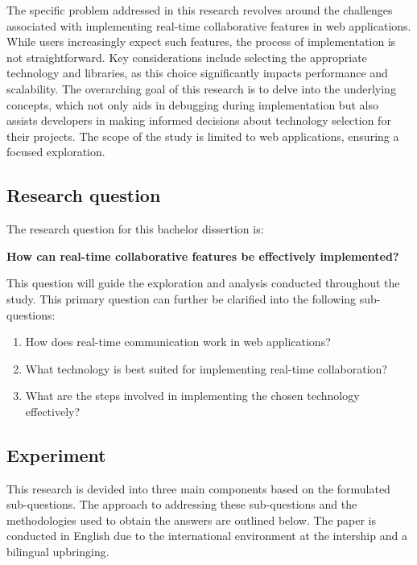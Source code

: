 The specific problem addressed in this research revolves around the challenges associated with implementing real-time collaborative features in web applications. While users increasingly expect such features, the process of implementation is not straightforward. Key considerations include selecting the appropriate technology and libraries, as this choice significantly impacts performance and scalability. The overarching goal of this research is to delve into the underlying concepts, which not only aids in debugging during implementation but also assists developers in making informed decisions about technology selection for their projects. The scope of the study is limited to web applications, ensuring a focused exploration.

\subsection{Research question}

The research question for this bachelor dissertion is:

\textbf{How can real-time collaborative features be effectively implemented?}

This question will guide the exploration and analysis conducted throughout the study. This primary question can further be clarified into the following sub-questions:

\begin{enumerate}
    \item How does real-time communication work in web applications?
    \item What technology is best suited for implementing real-time collaboration?
    \item What are the steps involved in implementing the chosen technology effectively?
\end{enumerate}

\subsection{Experiment}

This research is devided into three main components based on the formulated sub-questions. The approach to addressing these sub-questions and the methodologies used to obtain the answers are outlined below. The paper is conducted in English due to the international environment at the intership and a bilingual upbringing.

